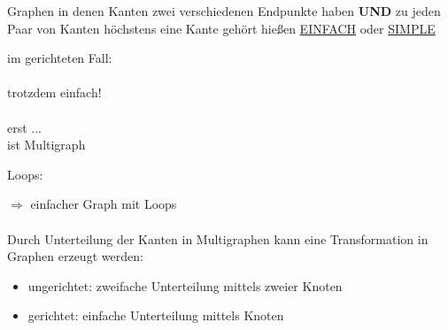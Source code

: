 Graphen in denen Kanten zwei verschiedenen Endpunkte haben \textbf{UND} zu jeden Paar von Kanten höchstens eine Kante gehört hießen \underline{EINFACH} oder \underline{SIMPLE}

im gerichteten Fall:\\
\\
trotzdem einfach!\\
\\
erst ... %
\\
ist Multigraph

Loops:

$\Rightarrow$ einfacher Graph mit Loops
\\\\
Durch Unterteilung der Kanten in Multigraphen kann eine Transformation in Graphen erzeugt werden:
\begin{itemize}
	\item ungerichtet: zweifache Unterteilung mittels zweier Knoten
	\item gerichtet: einfache Unterteilung mittels Knoten
\end{itemize}

